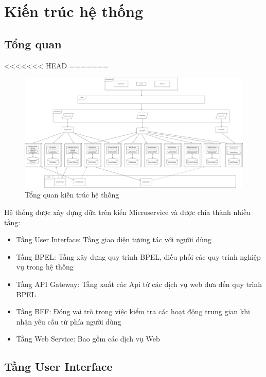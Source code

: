 
\section{Kiến trúc hệ thống}
\subsection{Tổng quan}
<<<<<<< HEAD
=======
\begin{figure}[!htp]
	\centering
	\includegraphics[width=6in]{img/Architecture/general-architect.png}
	\newline
	\caption{Tổng quan kiến trúc hệ thống}
\end{figure}

Hệ thống được xây dựng dữa trên kiến Microservice và được chia thành nhiều tầng:
\begin{itemize}
	\item Tầng User Interface: Tầng giao diện tương tác với người dùng
	\item Tầng BPEL: Tầng xây dựng quy trình BPEL, điều phối các quy trình nghiệp vụ trong hệ thống
	\item Tầng API Gateway: Tầng xuất các Api từ các dịch vụ web đưa đến quy trình BPEL
	\item Tầng BFF: Đóng vai trò trong việc kiểm tra các hoạt động trung gian khi nhận yêu cầu từ phía người dùng
	\item Tầng Web Service: Bao gồm các dịch vụ Web 
\end{itemize}


\subsection{Tầng User Interface}


